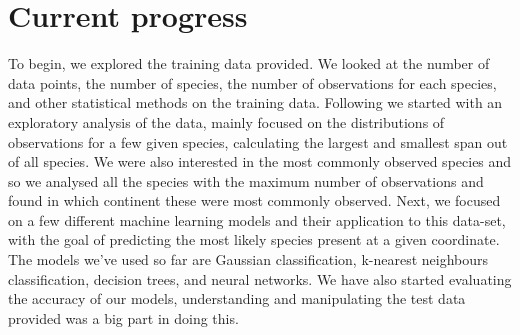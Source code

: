 \section*{Current progress}
To begin, we explored the training data provided. We looked at the number of data points, the number of
species, the number of observations for each species, and other statistical methods on the training data. Following we started with an exploratory analysis of the data, mainly focused on the distributions of observations for a few given species, calculating the largest and smallest span out of all species. We were also interested in the most commonly observed species and so we analysed all the species with the maximum number of observations and found in which continent these were most commonly observed. Next, we focused on a few different machine learning models and their application to
this data-set, with the goal of predicting the most likely species present at a given coordinate. The
models we’ve used so far are Gaussian classification, k-nearest neighbours classification, decision
trees, and neural networks. We have also started evaluating the accuracy of our models, understanding and manipulating the test data provided was a big part in doing this.
